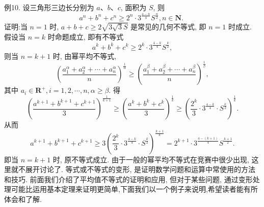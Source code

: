 例10. 设三角形三边长分别为 $a 、 b 、 c$, 面积为 $S$, 则
$$
a^n+b^n+c^n \geqslant 2^n \cdot 3^{\frac{4-n}{4}} S^{\frac{n}{2}}, n \in \mathbf{N} \text {. }
$$
证明:当 $n=1$ 时, $a+b+c \geqslant 2 \sqrt{3 \sqrt{3} S}$ 是常见的几何不等式, 即 $n=1$ 时成立.
假设当 $n=k$ 时命题成立, 即有不等式
$$
a^k+b^k+c^k \geqslant 2^k \cdot 3^{\frac{4-k}{4}} S^{\frac{k}{2}},
$$
则当 $n=k+1$ 时, 由幂平均不等式,
$$
\left(\frac{a_1^\alpha+a_2^\alpha+\cdots+a_n^\alpha}{n}\right)^{\frac{1}{\alpha}} \geqslant\left(\frac{a_1^\beta+a_2^\beta+\cdots+a_n^\beta}{n}\right)^{\frac{1}{\beta}},
$$
其中 $a_i \in \mathbf{R}^{+}, i=1,2, \cdots, n, \alpha \geqslant \beta$.
得
$$
\left(\frac{a^{k+1}+b^{k+1}+c^{k+1}}{3}\right)^{\frac{1}{k+1}} \geqslant\left(\frac{a^k+b^k+c^k}{3}\right)^{\frac{1}{k}} \geqslant\left(\frac{2^k}{3} \cdot 3^{\frac{4-k}{4}} \cdot S^{\frac{k}{2}}\right)^{\frac{1}{k}} .
$$
从而
$$
a^{k+1}+b^{k+1}+c^{k+1} \geqslant 3\left(\frac{2^k}{3} \cdot 3^{\frac{4-k}{4}} \cdot S^{\frac{k}{2}}\right)^{\frac{k+1}{k}}=2^{k+1} \cdot 3^{\frac{4-(k+1)}{4}} S^{\frac{k+1}{2}} .
$$
即当 $n=k+1$ 时, 原不等式成立.
由于一般的幂平均不等式在竞赛中很少出现, 这里就不展开讨论了.
等式或不等式的变形, 是证明数学问题和运算中常使用的方法和技巧.
前面我们介绍了平均值不等式的证明和应用, 但对于某些问题, 通过变形处理可能比运用基本定理来证明更简单,下面我们以一个例子来说明,希望读者能有所体会和了解.



